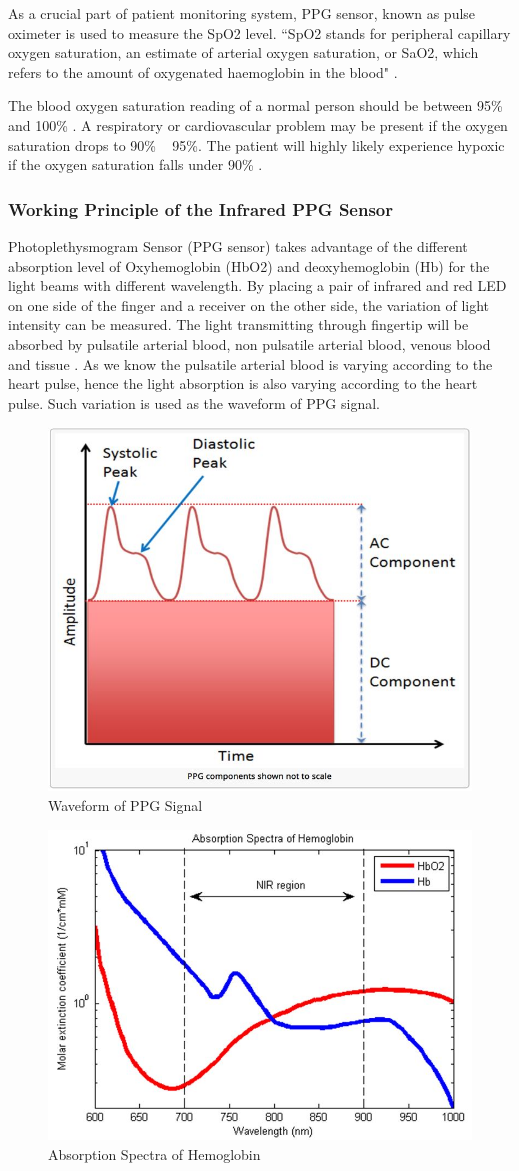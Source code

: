 As a crucial part of patient monitoring system, PPG sensor, known as pulse oximeter is used to measure the SpO2 level. “SpO2 stands for peripheral capillary oxygen saturation, an estimate of arterial oxygen saturation, or SaO2, which refers to the amount of oxygenated haemoglobin in the blood" \cite{george1}.

The blood oxygen saturation reading of a normal person should be between 95\% and 100\% \cite{george1}. A respiratory or cardiovascular problem may be present if the oxygen saturation drops to 90\% ~ 95\%. The patient will highly likely experience hypoxic if the oxygen saturation falls under 90\% \cite{george2}.

\subsubsection{Working Principle of the Infrared PPG Sensor}

Photoplethysmogram Sensor (PPG sensor) takes advantage of the different absorption level of Oxyhemoglobin (HbO2) and deoxyhemoglobin (Hb) for the light beams with different wavelength. By placing a pair of infrared and red LED on one side of the finger and a receiver on the other side, the variation of light intensity can be measured. The light transmitting through fingertip will be absorbed by pulsatile arterial blood, non pulsatile arterial blood, venous blood and tissue \cite{george5}. As we know the pulsatile arterial blood is varying according to the heart pulse, hence the light absorption is also varying according to the heart pulse. Such variation is used as the waveform of PPG signal.

\begin{figure}[H]
	\centering
	\includegraphics[width=0.5\linewidth]{georgepic1.jpg}
	\caption{Waveform of PPG Signal \cite{george6}}
\end{figure}

\begin{figure}[H]
	\centering
	\includegraphics[width=0.5\linewidth]{georgepic2.jpg}
	\caption{Absorption Spectra of Hemoglobin \cite{george3}}
\end{figure}

